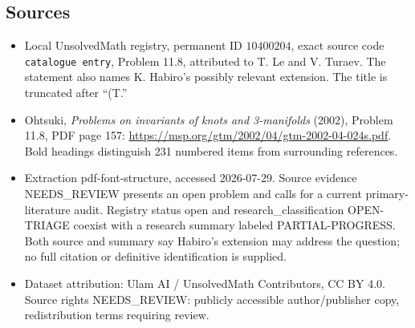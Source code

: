 \documentclass[11pt]{article}
\begin{document}
\subsection{Sources}
\begin{itemize}
\item Local UnsolvedMath registry, permanent ID \(10400204\), exact source code \texttt{catalogue entry}, Problem 11.8, attributed to T. Le and V. Turaev. The statement also names K. Habiro's possibly relevant extension. The title is truncated after ``(T.''
\item Ohtsuki, \emph{Problems on invariants of knots and 3-manifolds} (2002), Problem 11.8, PDF page 157: \url{https://msp.org/gtm/2002/04/gtm-2002-04-024s.pdf}. Bold headings distinguish 231 numbered items from surrounding references.
\item Extraction pdf-font-structure, accessed 2026-07-29. Source evidence NEEDS\_REVIEW presents an open problem and calls for a current primary-literature audit. Registry status open and research\_classification OPEN-TRIAGE coexist with a research summary labeled PARTIAL-PROGRESS. Both source and summary say Habiro's extension may address the question; no full citation or definitive identification is supplied.
\item Dataset attribution: Ulam AI / UnsolvedMath Contributors, CC BY 4.0. Source rights NEEDS\_REVIEW: publicly accessible author/publisher copy, redistribution terms requiring review.
\end{itemize}
\end{document}
